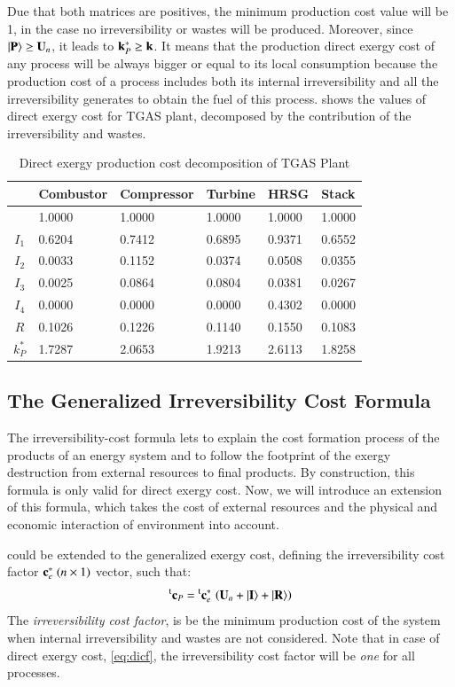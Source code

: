 \documentclass{ecos2018}
\begin{document}
Due that both matrices are positives, the minimum production cost value will be 1, in  the case no irreversibility or wastes will be produced. Moreover, since $\left| {\textbf{P} } \right\rangle\ge\mathbf{U}_n$, it leads to $\mathbf{k}_P^*\ge\mathbf{k}$.
It means that the production direct exergy cost of any process will be always bigger or equal to its local consumption because the production cost of a process includes both its internal irreversibility and all the irreversibility generates to obtain the fuel of this process.  shows the values of direct exergy cost for TGAS plant, decomposed by the contribution of the irreversibility and wastes.
\begin{table}[htbp]
	\caption{Direct exergy production cost decomposition of TGAS Plant}
	\begin{tabularx}{0.8\textwidth}{cZZZZZ}
		\addlinespace
		\toprule
		& Combustor & Compressor & Turbine & HRSG  & Stack \\
		\midrule
		& 1.0000 & 1.0000 & 1.0000 & 1.0000 & 1.0000 \\
		\midrule
		$I_1$ & 0.6204 & 0.7412 & 0.6895 & 0.9371 & 0.6552 \\
		$I_2$ & 0.0033 & 0.1152 & 0.0374 & 0.0508 & 0.0355 \\
		$I_3$ & 0.0025 & 0.0864 & 0.0804 & 0.0381 & 0.0267 \\
		$I_4$ & 0.0000 & 0.0000 & 0.0000 & 0.4302 & 0.0000 \\
		$R$   & 0.1026 & 0.1226 & 0.1140 & 0.1550 & 0.1083 \\
		\midrule
		$k_P^*$& 1.7287 & 2.0653 & 1.9213 & 2.6113 & 1.8258 \\
		\bottomrule
	\end{tabularx}
	\label{tab3}
\end{table}

\subsection{The Generalized Irreversibility Cost Formula}
The irreversibility-cost formula lets to explain the cost formation process of the products of an energy system and to follow the footprint of the exergy destruction from external resources to final products. By construction, this formula is only valid for direct exergy cost. Now, we will introduce an extension of this formula, which takes the cost of external resources and the physical and economic interaction of environment into account.

 could be extended to the generalized exergy cost, defining the irreversibility cost factor $\mathbf{c}_{e}^{*}\;(n\times1)$  vector, such that:
\begin{equation}
\prescript{\smash{\mathrm{t}}}{}{\mathbf{c}}_P=\prescript{\smash{\mathrm{t}}}{}{\mathbf{c}}_{e}^{*}\,\left(\mathbf{U}_n+\left| {\textbf{I} } \right\rangle+\left| {\textbf{R} } \right\rangle\right)
\end{equation}
The \emph{irreversibility cost factor}, is be the minimum production cost of the system when  internal irreversibility and wastes are not considered. Note that in case of direct exergy cost, \cref{eq:dicf}, the irreversibility cost factor will be \emph{one} for all processes.
\end{document}
